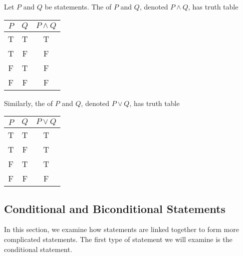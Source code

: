 \begin{definition}
    Let $P$ and $Q$ be statements. The  of $P$ and $Q$, denoted $P \land Q$, has truth table
    \begin{table}[H]
        \centering
        \begin{tabular}{|c|c|c|}
        \hline
        $P$ & $Q$ & $P \land Q$ \\ \hline\hline
        T & T & T \\ \hline
        T & F & F \\ \hline
        F & T & F \\ \hline
        F & F & F \\ \hline
        \end{tabular}
    \end{table}

    Similarly, the  of $P$ and $Q$, denoted $P \lor Q$, has truth table
    \begin{table}[H]
        \centering
        \begin{tabular}{|c|c|c|}
        \hline
        $P$ & $Q$ & $P \lor Q$ \\ \hline\hline
        T & T & T \\ \hline
        T & F & T \\ \hline
        F & T & T \\ \hline
        F & F & F \\ \hline
        \end{tabular}
    \end{table}
\end{definition}

\begin{proposition}
    
\end{proposition}

\subsection{Conditional and Biconditional Statements}

In this section, we examine how statements are linked together to form more complicated statements. The first type of statement we will examine is the conditional statement.

